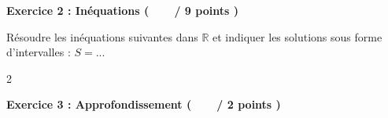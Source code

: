 \documentclass[12pt,a4paper]{exam}
\begin{document}
\vspace{0.5cm}

\noindent
\textbf{Exercice 2 : Inéquations (\ \ \ \  / 9 points )}
\vspace{5pt}

\begin{questions}

\question[4] Résoudre les inéquations suivantes dans $\mathbb{R}$ et indiquer les solutions sous forme d'intervalles : $S = ...$
\begin{multicols}{2}
    \begin{parts}
        \part $7x + 3 > 2x - 5$
        \textcolor{red}{$S = \left]-\dfrac{8}{5}; +\infty\right[$}

        \part $-4x \geq 3x - 1$
        \textcolor{red}{$S = \left]-\infty; \dfrac{1}{7}\right]$}
    \end{parts}
\end{multicols}
\begin{parts}
    \setcounter{partno}{2}
    \part $(1-x)(3x+2) \leq 0$
    \textcolor{red}{$S = \left]-\infty; -\dfrac{2}{3}\right] \cup \left[1; +\infty\right[$}

    \part $\dfrac{-7x+14}{2x} < 0$
    \textcolor{red}{$S = \left]-\infty; 0\right[ \cup \left]2; +\infty\right[$}
\end{parts}

\end{questions}

\vspace{10pt}

\noindent
\textbf{Exercice 3 : Approfondissement (\ \ \ \  / 2 points )}
\vspace{5pt}
\end{document}
